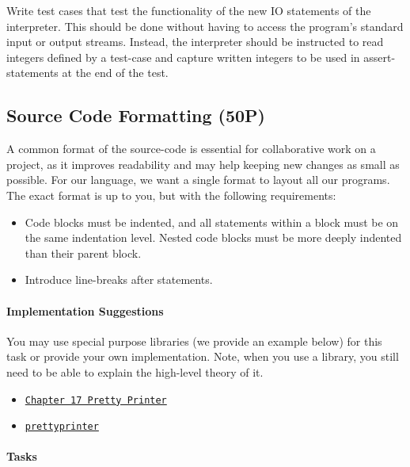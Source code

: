 \documentclass{article}
\begin{document}
Write test cases that test the functionality of the new IO statements of the interpreter. This should be done without having to access the program's standard input or output streams. Instead, the interpreter should be instructed to read integers defined by a test-case and capture written integers to be used in assert-statements at the end of the test.

\subsection{Source Code Formatting (50P)}

A common format of the source-code is essential for collaborative work on a project, as it improves readability and may help keeping new changes as small as possible. For our language, we want a single format to layout all our programs. The exact format is up to you, but with the following requirements:

\begin{itemize}
\item Code blocks must be indented, and all statements within a block must be on the same indentation level. Nested code blocks must be more deeply indented than their parent block.
\item Introduce line-breaks after statements.
\end{itemize}

\paragraph{Implementation Suggestions}

You may use special purpose libraries (we provide an example below) for this task or provide your own implementation. Note, when you use a library, you still need to be able to explain the high-level theory of it.

\begin{itemize}
\item \href{https://www.complang.tuwien.ac.at/knoop/lehre/ss21/ffp185A05/ffp185A05_ss21_210326.pdf}{\texttt{Chapter 17 Pretty Printer}}
\item \href{https://hackage.haskell.org/package/prettyprinter}{\texttt{prettyprinter}}
\end{itemize}

\paragraph{Tasks}
\end{document}
